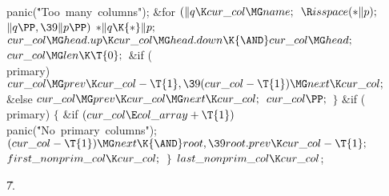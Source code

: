 \\{panic}(\.{"Too\ many\ columns"});\2\6
\&{for} ${}(\|q\K\\{cur\_col}\MG\\{name};{}$ ${}\R\\{isspace}({*}\|p);{}$ ${}%
\|q\PP,\39\|p\PP){}$\1\5
${}{*}\|q\K{*}\|p;{}$\2\6
${}\\{cur\_col}\MG\\{head}.\\{up}\K\\{cur\_col}\MG\\{head}.\\{down}\K{\AND}%
\\{cur\_col}\MG\\{head};{}$\6
${}\\{cur\_col}\MG\\{len}\K\T{0};{}$\6
\&{if} (\\{primary})\1\5
${}\\{cur\_col}\MG\\{prev}\K\\{cur\_col}-\T{1},\39(\\{cur\_col}-\T{1})\MG%
\\{next}\K\\{cur\_col};{}$\2\6
\&{else}\1\5
${}\\{cur\_col}\MG\\{prev}\K\\{cur\_col}\MG\\{next}\K\\{cur\_col};{}$\2\6
${}\\{cur\_col}\PP;{}$\6
\4${}\}{}$\2\6
\&{if} (\\{primary})\5
${}\{{}$\1\6
\&{if} ${}(\\{cur\_col}\E\\{col\_array}+\T{1}){}$\1\5
\\{panic}(\.{"No\ primary\ columns"});\2\6
${}(\\{cur\_col}-\T{1})\MG\\{next}\K{\AND}\\{root},\39\\{root}.\\{prev}\K\\{cur%
\_col}-\T{1};{}$\6
${}\\{first\_nonprim\_col}\K\\{cur\_col};{}$\6
\4${}\}{}$\2\6
${}\\{last\_nonprim\_col}\K\\{cur\_col}{}$;\par
\U7.\fi


